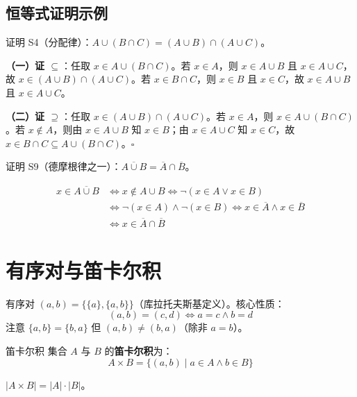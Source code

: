 \subsection{恒等式证明示例}

\begin{example}
证明 S4（分配律）：$A \cup (B \cap C) = (A \cup B) \cap (A \cup C)$。

\textbf{（一）证 $\subseteq$}：任取 $x \in A \cup (B \cap C)$。若 $x \in A$，则 $x \in A \cup B$ 且 $x \in A \cup C$，故 $x \in (A \cup B) \cap (A \cup C)$。若 $x \in B \cap C$，则 $x \in B$ 且 $x \in C$，故 $x \in A \cup B$ 且 $x \in A \cup C$。

\textbf{（二）证 $\supseteq$}：任取 $x \in (A \cup B) \cap (A \cup C)$。若 $x \in A$，则 $x \in A \cup (B \cap C)$。若 $x \notin A$，则由 $x \in A \cup B$ 知 $x \in B$；由 $x \in A \cup C$ 知 $x \in C$，故 $x \in B \cap C \subseteq A \cup (B \cap C)$。$\square$
\end{example}

\begin{example}
证明 S9（德摩根律之一）：$\overline{A \cup B} = \overline{A} \cap \overline{B}$。

\[
\begin{aligned}
x \in \overline{A \cup B}
&\iff x \notin A \cup B
\iff \neg(x \in A \lor x \in B) \\
&\iff \neg(x \in A) \land \neg(x \in B)
\iff x \in \overline{A} \land x \in \overline{B} \\
&\iff x \in \overline{A} \cap \overline{B}
\end{aligned}
\]
\end{example}

\section{有序对与笛卡尔积}

\begin{mydefinition}{有序对}
$(a, b) = \{\{a\}, \{a, b\}\}$（库拉托夫斯基定义）。核心性质：
\[(a, b) = (c, d) \iff a = c \land b = d\]
注意 $\{a, b\} = \{b, a\}$ 但 $(a, b) \neq (b, a)$（除非 $a = b$）。
\end{mydefinition}

\begin{mydefinition}{笛卡尔积}
集合 $A$ 与 $B$ 的\textbf{笛卡尔积}为：
\[A \times B = \{(a, b) \mid a \in A \land b \in B\}\]
\end{mydefinition}

$|A \times B| = |A| \cdot |B|$。

